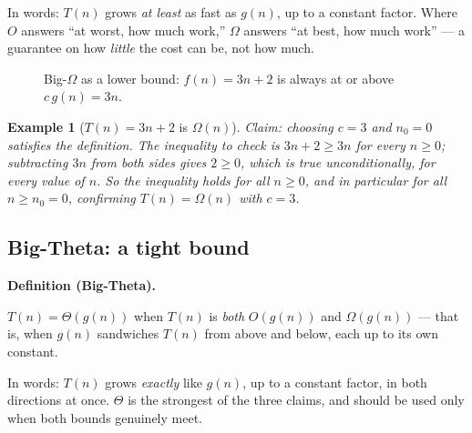 \documentclass[11pt]{article}
\newtheorem{example}{Example}[section]
\newenvironment{definitionbox}[1]{%
  \par\noindent\textbf{Definition (#1).}\ \itshape
}{\par\vspace{0.3em}}
\begin{document}
In words: $T(n)$ grows \emph{at least} as fast as $g(n)$, up to a constant
factor. Where $O$ answers ``at worst, how much work,'' $\Omega$ answers ``at
best, how much work'' --- a guarantee on how \emph{little} the cost can be,
not how much.

\begin{figure}[h]
  \centering
  \caption{Big-$\Omega$ as a lower bound: $f(n)=3n+2$ is always at or above
  $c\,g(n)=3n$.}
  \label{fig:bigomega}
\end{figure}

\begin{example}[$T(n) = 3n + 2$ is $\Omega(n)$]
Claim: choosing $c = 3$ and $n_0 = 0$ satisfies the definition. The
inequality to check is $3n + 2 \geq 3n$ for every $n \geq 0$; subtracting
$3n$ from both sides gives $2 \geq 0$, which is true unconditionally, for
every value of $n$. So the inequality holds for \emph{all} $n \geq 0$, and in
particular for all $n \geq n_0 = 0$, confirming $T(n) = \Omega(n)$ with
$c = 3$.
\end{example}

\subsection{Big-Theta: a tight bound}

\begin{definitionbox}{Big-Theta}
$T(n) = \Theta(g(n))$ when $T(n)$ is \emph{both} $O(g(n))$ and $\Omega(g(n))$
--- that is, when $g(n)$ sandwiches $T(n)$ from above and below, each up to
its own constant.
\end{definitionbox}

In words: $T(n)$ grows \emph{exactly} like $g(n)$, up to a constant factor,
in both directions at once. $\Theta$ is the strongest of the three claims,
and should be used only when both bounds genuinely meet.
\end{document}

